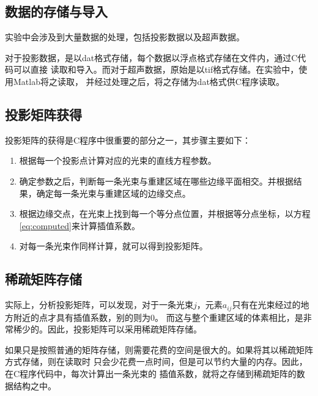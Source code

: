 \subsection{数据的存储与导入}
实验中会涉及到大量数据的处理，包括投影数据以及超声数据。

对于投影数据，是以dat格式存储，每个数据以浮点格式存储在文件内，通过C代码可以直接
读取和导入。而对于超声数据，原始是以tif格式存储。在实验中，使用Matlab将之读取，
并经过处理之后，将之存储为dat格式供C程序读取。
\subsection{投影矩阵获得}
投影矩阵的获得是C程序中很重要的部分之一，其步骤主要如下：
\begin{enumerate}
\item 根据每一个投影点计算对应的光束的直线方程参数。
\item 确定参数之后，判断每一条光束与重建区域在哪些边缘平面相交。并根据结果，确定每一条光束与重建区域的边缘交点。
\item 根据边缘交点，在光束上找到每一个等分点位置，并根据等分点坐标，以方程\eqref{eq:computed}来计算插值系数。
\item 对每一条光束作同样计算，就可以得到投影矩阵。
\end{enumerate}
\subsection{稀疏矩阵存储}
实际上，分析投影矩阵，可以发现，对于一条光束$j$，元素$a_{ij}$只有在光束经过的地方附近的点才具有插值系数，别的则为$0$。
而这与整个重建区域的体素相比，是非常稀少的。因此，投影矩阵可以采用稀疏矩阵存储。

如果只是按照普通的矩阵存储，则需要花费的空间是很大的。如果将其以稀疏矩阵方式存储，则在读取时
只会少花费一点时间，但是可以节约大量的内存。因此，在C程序代码中，每次计算出一条光束的
插值系数，就将之存储到稀疏矩阵的数据结构之中。
